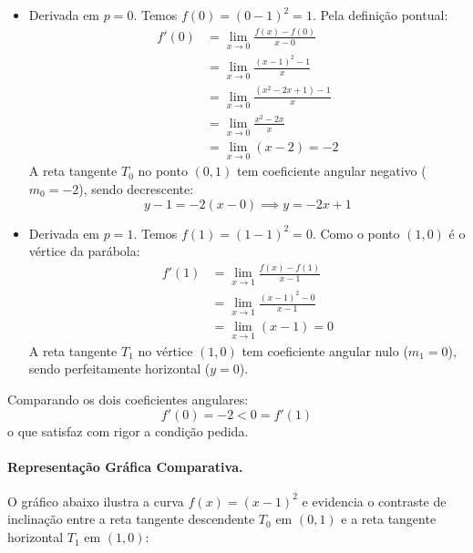 \begin{itemize}[leftmargin=*, label=$\bullet$]
    \item Derivada em $p = 0$. Temos $f(0) = (0 - 1)^2 = 1$. Pela definição pontual:
    \begin{align*}
    f'(0) &= \lim_{x \to 0} \frac{f(x) - f(0)}{x - 0} \\
          &= \lim_{x \to 0} \frac{(x - 1)^2 - 1}{x} \\
          &= \lim_{x \to 0} \frac{(x^2 - 2x + 1) - 1}{x} \\
          &= \lim_{x \to 0} \frac{x^2 - 2x}{x} \\
          &= \lim_{x \to 0} (x - 2) = -2
    \end{align*}
    A reta tangente $T_0$ no ponto $(0, 1)$ tem coeficiente angular negativo ($m_0 = -2$), sendo decrescente:
    \[
    y - 1 = -2(x - 0) \implies y = -2x + 1
    \]

    \item Derivada em $p = 1$. Temos $f(1) = (1 - 1)^2 = 0$. Como o ponto $(1, 0)$ é o vértice da parábola:
    \begin{align*}
    f'(1) &= \lim_{x \to 1} \frac{f(x) - f(1)}{x - 1} \\
          &= \lim_{x \to 1} \frac{(x - 1)^2 - 0}{x - 1} \\
          &= \lim_{x \to 1} (x - 1) = 0
    \end{align*}
    A reta tangente $T_1$ no vértice $(1, 0)$ tem coeficiente angular nulo ($m_1 = 0$), sendo perfeitamente horizontal ($y = 0$).
\end{itemize}

Comparando os dois coeficientes angulares:
\[
f'(0) = -2 < 0 = f'(1)
\]
o que satisfaz com rigor a condição pedida.

\paragraph{Representação Gráfica Comparativa.}

O gráfico abaixo ilustra a curva $f(x) = (x - 1)^2$ e evidencia o contraste de inclinação entre a reta tangente descendente $T_0$ em $(0, 1)$ e a reta tangente horizontal $T_1$ em $(1, 0)$:

